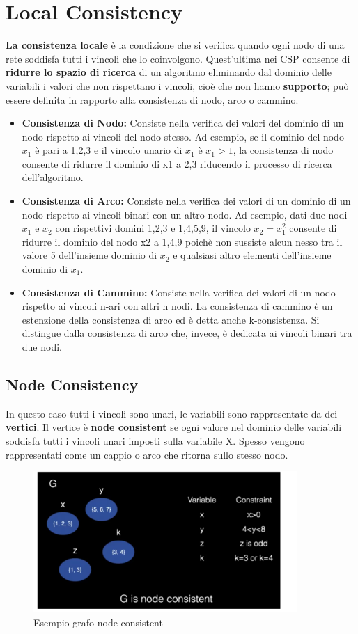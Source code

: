 \section{Local Consistency}
\textbf{La consistenza locale} è la condizione che si verifica quando ogni nodo di una rete soddisfa tutti i vincoli che lo coinvolgono. Quest’ultima nei CSP consente di \textbf{ridurre lo spazio di ricerca} di un algoritmo eliminando dal dominio delle variabili i valori che non rispettano i vincoli, cioè che non hanno \textbf{supporto}; può essere definita in rapporto alla consistenza di nodo, arco o cammino.
\begin{itemize}
    \item \textbf{Consistenza di Nodo:} Consiste nella verifica dei valori del dominio di un nodo rispetto ai vincoli del nodo stesso. Ad esempio, se il dominio del nodo $x_1$ è pari a 1,2,3 e il vincolo unario di $x_1$ è $x_1 > 1$, la consistenza di nodo consente di ridurre il dominio di x1 a 2,3 riducendo il processo di ricerca dell’algoritmo.
    \item \textbf{Consistenza di Arco:} Consiste nella verifica dei valori di un dominio di un nodo rispetto ai vincoli binari con un altro nodo. Ad esempio, dati due nodi $x_1$ e $x_2$ con rispettivi domini 1,2,3 e 1,4,5,9, il vincolo $x_2 = x_{1}^2$ consente di ridurre il dominio del nodo x2 a 1,4,9 poichè non sussiste alcun nesso tra il valore 5 dell’insieme dominio di $x_2$ e qualsiasi altro elementi dell’insieme dominio di $x_1$.
    \newpage
    \item \textbf{Consistenza di Cammino:} Consiste nella verifica dei valori di un nodo rispetto ai vincoli n-ari con altri n nodi. La consistenza di cammino è un estenzione della consistenza di arco ed è detta anche k-consistenza. Si distingue dalla consistenza di arco che, invece, è dedicata ai vincoli binari tra due nodi.
\end{itemize}
\subsection{Node Consistency}
In questo caso tutti i vincoli sono unari, le variabili sono rappresentate da dei \textbf{vertici}. Il vertice è \textbf{node consistent} se ogni valore nel dominio delle variabili soddisfa tutti i vincoli unari imposti sulla variabile X. Spesso vengono rappresentati come un cappio o arco che ritorna sullo stesso nodo.
\begin{figure}[htp]
	\centering
    \includegraphics[width=10cm, keepaspectratio]{img/Cap3/node1.png}
    \caption{Esempio grafo node consistent}
\end{figure}
